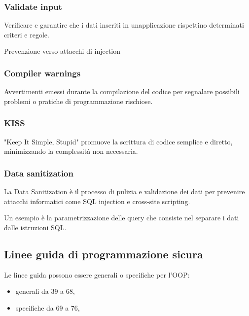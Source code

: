 \subsubsection{Validate input}\label{validate-input-1}

Verificare e garantire che i dati inseriti in
un\textquotesingle applicazione rispettino determinati criteri e regole.

Prevenzione verso attacchi di injection

\subsubsection{Compiler warnings}\label{compiler-warnings-1}

Avvertimenti emessi durante la compilazione del codice per segnalare
possibili problemi o pratiche di programmazione rischiose.

\subsubsection{KISS}\label{kiss-1}

"Keep It Simple, Stupid" promuove la scrittura di codice semplice e
diretto, minimizzando la complessità non necessaria.

\subsubsection{Data sanitization}\label{data-sanitization-1}

La Data Sanitization è il processo di pulizia e validazione dei dati per
prevenire attacchi informatici come SQL injection e cross-site
scripting.

Un esempio è la parametrizzazione delle query che consiste nel separare
i dati dalle istruzioni SQL.

\subsection{Linee guida di programmazione
sicura}\label{linee-guida-di-programmazione-sicura}

Le linee guida possono essere generali o specifiche per l'OOP:

\begin{itemize}
\item
  generali da 39 a 68,
\item
  specifiche da 69 a 76,
\end{itemize}

